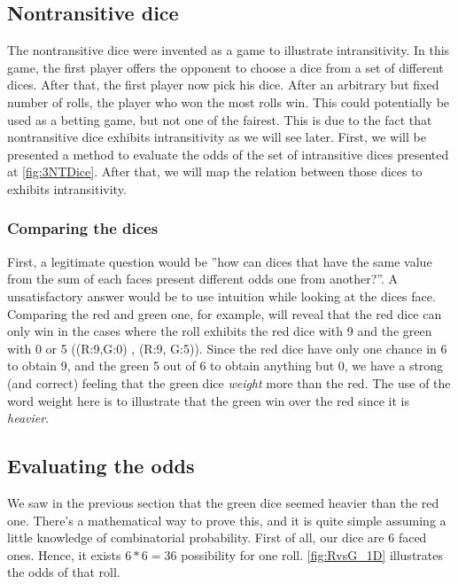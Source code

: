 \documentclass{article}
\begin{document}
    \subsection{Nontransitive dice}
    \label{NTDice}

    The nontransitive dice were invented as a game to illustrate intransitivity.
    In this game, the first player offers the opponent to choose a dice from a
    set of different dices. After that, the first player now pick his dice.
    After an arbitrary but fixed number of rolls, the player who won the most
    rolls win. This could potentially be used as a betting game, but not one of
    the fairest. This is due to the fact that nontransitive dice exhibits
    intransitivity as we will see later. First, we will be presented a method to
    evaluate the odds of the set of intransitive dices presented at
    \ref{fig:3NTDice}. After that, we will map the relation between those dices
    to exhibits intransitivity.
    
	\subsubsection{Comparing the dices}

    First, a legitimate question would be ''how can dices that have the same
    value from the sum of each faces present different odds one from another?''.
    A unsatisfactory answer would be to use intuition while looking at the
    dices face. Comparing the red and green one, for example, will reveal that
    the red dice can only win in the cases where the roll exhibits the red dice
    with 9 and the green with 0 or 5 ((R:9,G:0) , (R:9, G:5)). Since the red
    dice have only one chance in 6 to obtain 9, and the green 5 out of 6 to
    obtain anything but 0, we have a strong (and correct) feeling that the green
    dice \textit{weight} more than the red. The use of the word weight here is
    to illustrate that the green win over the red since it is \textit{heavier}.
    
    \subsection{Evaluating the odds}
    
    We saw in the previous section that the green dice seemed heavier than
    the red one. There's a mathematical way to prove this, and it is quite simple
    assuming a little knowledge of combinatorial probability. First of all, our
    dice are 6 faced ones. Hence, it exists $ 6 * 6 = 36$ possibility for one
    roll. \ref{fig:RvsG_1D} illustrates the odds of that roll. 
    
\end{document}

